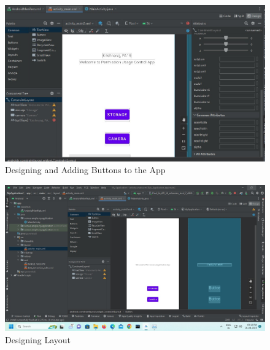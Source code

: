 \documentclass[11pt]{article}
\begin{document}
\begin{figure}[H]
    \centering
    \includegraphics[width=.95\textwidth]{../../Programs/Assignment 4/screenshots/4.jpeg}
    \caption{Designing and Adding Buttons to the App}
\end{figure}

\begin{figure}[H]
    \centering
    \includegraphics[width=.95\textwidth]{../../Programs/Assignment 4/screenshots/5.jpeg}
    \caption{Designing Layout}
\end{figure}
\end{document}

